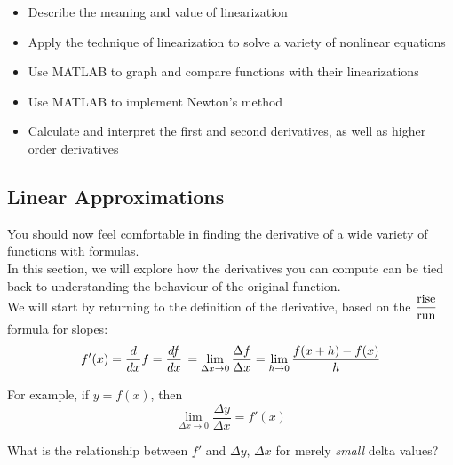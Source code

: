 



\setfont
\pagestyle{fancy}
\renewcommand{\Week}{2 }
\renewcommand{\WeekTitle}{\WeekTitleTwo }

\fancyhead[LE,RO]{Week \Week}  %
\fancyfoot{}
\sectionbox{Week \#\Week: \WeekTitle}


\vspace{5mm}
\goals
\begin{itemize}
\item Describe the meaning and value of linearization
\item Apply the technique of linearization to solve a variety of
  nonlinear equations
\item Use MATLAB to graph and compare functions with their
  linearizations
\item Use MATLAB to implement Newton's method
\item Calculate and interpret the first and second derivatives, as
  well as higher order derivatives
 \end{itemize}

\vspace{5mm}

\newpage
{}
\subsection*{Linear Approximations}

You should now feel comfortable in finding the derivative of a wide
variety of functions with formulas. \\[1ex]

In this section, we will explore how the derivatives you can compute
can be tied back to understanding the behaviour of the original
function. \\[1ex]

We will start by returning to the definition of the derivative, based
on the $\displaystyle \frac{\mbox{rise}}{\mbox{run}}$ formula for slopes: 
\begin{align*} 
  f'(x) = \frac{d}{dx} f = \frac{df}{dx} \, = \lim_{\Delta x \to 0} \frac{\Delta f}{\Delta x} = \lim_{h \to 0} \frac{f(x+h) - f(x)}{h}
\end{align*} 



\newpage 
For example, if $y = f(x)$, then 
\[ \lim_{\Delta x \to 0} \frac{\Delta y}{\Delta x} = f'(x) 
\]
\begin{problem}
 What is the relationship between $f'$ and $\Delta y$,
	$\Delta x$ for merely {\em small} delta values? 
\end{problem}
\vfill

